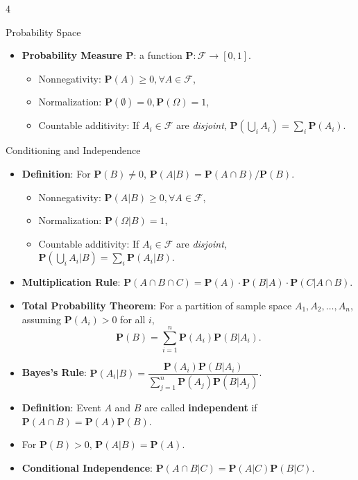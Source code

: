 \documentclass[landscape,a4paper]{article}
\newcommand{\PP}{\mathbf{P}}
\begin{document}
\begin{multicols*}{4}
\begin{card}{Probability Space}
\begin{itemize}
				\item \textbf{Probability Measure $\PP$}: a function $\PP \colon \mathcal F\to [0,1]$.
				\begin{itemize}
					\item Nonnegativity: $\PP(A)\ge 0,\forall A\in\mathcal F$,
					\item Normalization: $\PP(\emptyset)=0,\PP(\Omega)=1$,
					\item Countable additivity: If $A_i\in\mathcal F$ are \textit{disjoint}, $\PP\left(\bigcup_i A_i\right)=\sum_i\PP(A_i)$.
				\end{itemize}
			\end{itemize}
		\end{card}
		\begin{card}{Conditioning and Independence}
			\begin{itemize}
				\item \textbf{Definition}: For $\PP(B)\neq 0$, $\PP(A|B)=\PP(A\cap B)/\PP(B)$.
				\begin{itemize}
					\item Nonnegativity: $\PP(A|B)\ge 0,\forall A\in\mathcal F$,
					\item Normalization: $\PP(\Omega|B)=1$,
					\item Countable additivity: If $A_i\in\mathcal F$ are \textit{disjoint}, $\PP\left(\bigcup_i A_i|B\right)=\sum_i\PP(A_i|B)$.
				\end{itemize}
				\item \textbf{Multiplication Rule}: $\PP(A\cap B\cap C)=\PP(A)\cdot\PP(B|A)\cdot\PP(C|A\cap B)$.
				\item \textbf{Total Probability Theorem}: For a partition of sample space $A_1, A_2,\dots, A_n$, assuming $\PP(A_i)>0$ for all $i$,
				\[
				\PP(B)=\sum_{i=1}^n \PP(A_i)\PP(B|A_i).
				\]
				\item \textbf{Bayes's Rule}: $\PP(A_i|B)=\dfrac{\PP(A_i)\PP(B|A_i)}{\sum_{j=1}^n\PP(A_j)\PP(B|A_j)}$.
			\end{itemize}
			\begin{itemize}
			\item \textbf{Definition}: Event $A$ and $B$ are called \textbf{independent} if $\PP(A\cap B)=\PP(A)\PP(B)$.
			\item For $\PP(B)>0$, $\PP(A|B)=\PP(A)$.
			\item \textbf{Conditional Independence}: $\PP(A\cap B|C)=\PP(A|C)\PP(B|C)$.

\end{itemize}
\end{card}
\end{multicols*}
\end{document}
